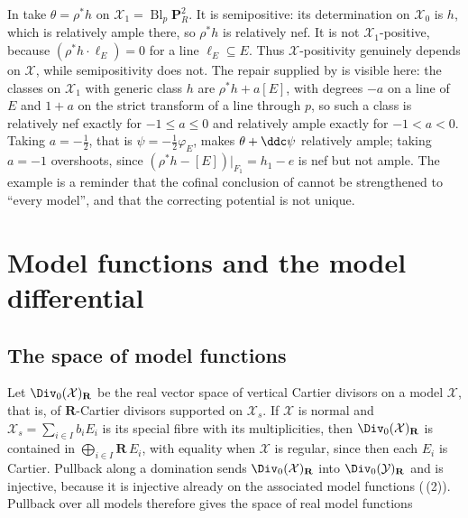 \begin{example}
\label{ex:ch20-nef-not-ample}
In  take \(\theta=\rho^*h\) on
\(\mathcal X_1=\operatorname{Bl}_p\mathbf P^2_R\).  It is semipositive: its
determination on \(\mathcal X_0\) is \(h\), which is relatively ample there,
so \(\rho^*h\) is relatively nef.  It is not \(\mathcal X_1\)-positive,
because \((\rho^*h\cdot\ell_E)=0\) for a line \(\ell_E\subseteq E\).  Thus
\(\mathcal X\)-positivity genuinely depends on \(\mathcal X\), while
semipositivity does not.  The repair supplied by
 is visible here: the classes on
\(\mathcal X_1\) with generic class \(h\) are \(\rho^*h+a[E]\), with degrees
\(-a\) on a line of \(E\) and \(1+a\) on the strict transform of a line
through \(p\), so such a class is relatively nef exactly for
\(-1\leq a\leq0\) and relatively ample exactly for \(-1<a<0\).  Taking
\(a=-\tfrac12\), that is \(\psi=-\tfrac12\varphi_E\), makes
\(\theta+\ddc\psi\) relatively ample; taking \(a=-1\) overshoots, since
\((\rho^*h-[E])|_{F_1}=h_1-e\) is nef but not ample.  The example is a
reminder that the cofinal conclusion of
 cannot be strengthened to ``every
model'', and that the correcting potential is not unique.
\end{example}

\section{Model functions and the model differential}
\label{sec:ch20-ddc}

\subsection{The space of model functions}
\label{sec:ch20-model-function-space}

Let \(\Div_0(\mathcal X)_{\mathbf R}\) be the real vector space of vertical
Cartier divisors on a model \(\mathcal X\), that is, of \(\mathbf R\)-Cartier
divisors supported on \(\mathcal X_s\).  If \(\mathcal X\) is normal and
\(\mathcal X_s=\sum_{i\in I}b_iE_i\) is its special fibre with its
multiplicities, then \(\Div_0(\mathcal X)_{\mathbf R}\) is contained in
\(\bigoplus_{i\in I}\mathbf R\,E_i\), with equality when \(\mathcal X\) is
regular, since then each \(E_i\) is Cartier.  Pullback along a domination
sends \(\Div_0(\mathcal X)_{\mathbf R}\) into
\(\Div_0(\mathcal Y)_{\mathbf R}\) and is injective, because it is injective
already on the associated model functions
(\,(2)).  Pullback over all models
therefore gives the space of real model functions

